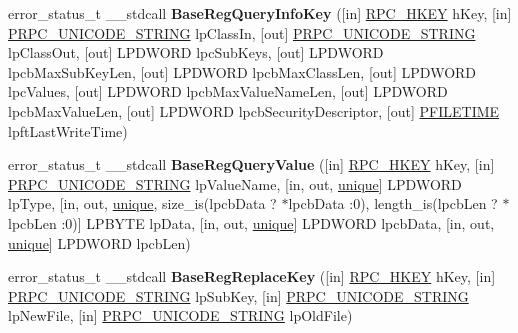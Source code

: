 \begin{DoxyCompactItemize}
\item 
\mbox{\label{interfacewinreg_a3dc60c7bdf71d575c0adff9bdf6a3a31}} 
error\+\_\+status\+\_\+t \+\_\+\+\_\+stdcall {\bfseries Base\+Reg\+Query\+Info\+Key} (\mbox{[}in\mbox{]} \hyperlink{interfacevoid}{R\+P\+C\+\_\+\+H\+K\+EY} h\+Key, \mbox{[}in\mbox{]} \hyperlink{struct___r_p_c___u_n_i_c_o_d_e___s_t_r_i_n_g}{P\+R\+P\+C\+\_\+\+U\+N\+I\+C\+O\+D\+E\+\_\+\+S\+T\+R\+I\+NG} lp\+Class\+In, \mbox{[}out\mbox{]} \hyperlink{struct___r_p_c___u_n_i_c_o_d_e___s_t_r_i_n_g}{P\+R\+P\+C\+\_\+\+U\+N\+I\+C\+O\+D\+E\+\_\+\+S\+T\+R\+I\+NG} lp\+Class\+Out, \mbox{[}out\mbox{]} L\+P\+D\+W\+O\+RD lpc\+Sub\+Keys, \mbox{[}out\mbox{]} L\+P\+D\+W\+O\+RD lpcb\+Max\+Sub\+Key\+Len, \mbox{[}out\mbox{]} L\+P\+D\+W\+O\+RD lpcb\+Max\+Class\+Len, \mbox{[}out\mbox{]} L\+P\+D\+W\+O\+RD lpc\+Values, \mbox{[}out\mbox{]} L\+P\+D\+W\+O\+RD lpcb\+Max\+Value\+Name\+Len, \mbox{[}out\mbox{]} L\+P\+D\+W\+O\+RD lpcb\+Max\+Value\+Len, \mbox{[}out\mbox{]} L\+P\+D\+W\+O\+RD lpcb\+Security\+Descriptor, \mbox{[}out\mbox{]} \hyperlink{struct___f_i_l_e_t_i_m_e}{P\+F\+I\+L\+E\+T\+I\+ME} lpft\+Last\+Write\+Time)
\item 
\mbox{\label{interfacewinreg_a96df418be4b93ff46edab5ec1628a3fc}} 
error\+\_\+status\+\_\+t \+\_\+\+\_\+stdcall {\bfseries Base\+Reg\+Query\+Value} (\mbox{[}in\mbox{]} \hyperlink{interfacevoid}{R\+P\+C\+\_\+\+H\+K\+EY} h\+Key, \mbox{[}in\mbox{]} \hyperlink{struct___r_p_c___u_n_i_c_o_d_e___s_t_r_i_n_g}{P\+R\+P\+C\+\_\+\+U\+N\+I\+C\+O\+D\+E\+\_\+\+S\+T\+R\+I\+NG} lp\+Value\+Name, \mbox{[}in, out, \hyperlink{interfaceunique}{unique}\mbox{]} L\+P\+D\+W\+O\+RD lp\+Type, \mbox{[}in, out, \hyperlink{interfaceunique}{unique}, size\+\_\+is(lpcb\+Data ? $\ast$lpcb\+Data \+:0), length\+\_\+is(lpcb\+Len ? $\ast$lpcb\+Len \+:0)\mbox{]} L\+P\+B\+Y\+TE lp\+Data, \mbox{[}in, out, \hyperlink{interfaceunique}{unique}\mbox{]} L\+P\+D\+W\+O\+RD lpcb\+Data, \mbox{[}in, out, \hyperlink{interfaceunique}{unique}\mbox{]} L\+P\+D\+W\+O\+RD lpcb\+Len)
\item 
\mbox{\label{interfacewinreg_a5b938f5efe238c01022d89e5897a85be}} 
error\+\_\+status\+\_\+t \+\_\+\+\_\+stdcall {\bfseries Base\+Reg\+Replace\+Key} (\mbox{[}in\mbox{]} \hyperlink{interfacevoid}{R\+P\+C\+\_\+\+H\+K\+EY} h\+Key, \mbox{[}in\mbox{]} \hyperlink{struct___r_p_c___u_n_i_c_o_d_e___s_t_r_i_n_g}{P\+R\+P\+C\+\_\+\+U\+N\+I\+C\+O\+D\+E\+\_\+\+S\+T\+R\+I\+NG} lp\+Sub\+Key, \mbox{[}in\mbox{]} \hyperlink{struct___r_p_c___u_n_i_c_o_d_e___s_t_r_i_n_g}{P\+R\+P\+C\+\_\+\+U\+N\+I\+C\+O\+D\+E\+\_\+\+S\+T\+R\+I\+NG} lp\+New\+File, \mbox{[}in\mbox{]} \hyperlink{struct___r_p_c___u_n_i_c_o_d_e___s_t_r_i_n_g}{P\+R\+P\+C\+\_\+\+U\+N\+I\+C\+O\+D\+E\+\_\+\+S\+T\+R\+I\+NG} lp\+Old\+File)

\end{DoxyCompactItemize}
